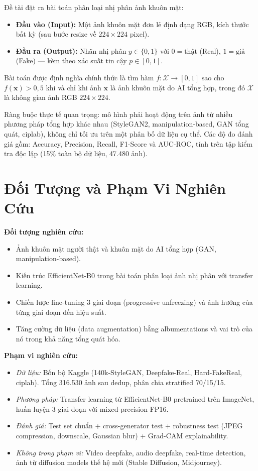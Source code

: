 Đề tài đặt ra bài toán phân loại nhị phân ảnh khuôn mặt:

\begin{itemize}
  \item \textbf{Đầu vào (Input):} Một ảnh khuôn mặt đơn lẻ định dạng RGB, kích thước bất kỳ (sau bước resize về $224 \times 224$ pixel).
  \item \textbf{Đầu ra (Output):} Nhãn nhị phân $y \in \{0, 1\}$ với $0 = \text{thật}$ (Real), $1 = \text{giả}$ (Fake) --- kèm theo xác suất tin cậy $p \in [0, 1]$.
\end{itemize}

Bài toán được định nghĩa chính thức là tìm hàm $f: \mathcal{X} \rightarrow [0,1]$ sao cho $f(\mathbf{x}) > 0{,}5$ khi và chỉ khi ảnh $\mathbf{x}$ là ảnh khuôn mặt do AI tổng hợp, trong đó $\mathcal{X}$ là không gian ảnh RGB $224 \times 224$.

Ràng buộc thực tế quan trọng: mô hình phải hoạt động trên ảnh từ nhiều phương pháp tổng hợp khác nhau (StyleGAN2, manipulation-based, GAN tổng quát, ciplab), không chỉ tối ưu trên một phân bố dữ liệu cụ thể. Các độ đo đánh giá gồm: Accuracy, Precision, Recall, F1-Score và AUC-ROC, tính trên tập kiểm tra độc lập (15\% toàn bộ dữ liệu, 47.480 ảnh).

\section{Đối Tượng và Phạm Vi Nghiên Cứu}

\textbf{Đối tượng nghiên cứu:}
\begin{itemize}
  \item Ảnh khuôn mặt người thật và khuôn mặt do AI tổng hợp (GAN, manipulation-based).
  \item Kiến trúc EfficientNet-B0 \cite{tan2019efficientnet} trong bài toán phân loại ảnh nhị phân với transfer learning.
  \item Chiến lược fine-tuning 3 giai đoạn (progressive unfreezing) và ảnh hưởng của từng giai đoạn đến hiệu suất.
  \item Tăng cường dữ liệu (data augmentation) bằng albumentations \cite{buslaev2020albumentations} và vai trò của nó trong khả năng tổng quát hóa.
\end{itemize}

\textbf{Phạm vi nghiên cứu:}
\begin{itemize}
  \item \textit{Dữ liệu:} Bốn bộ Kaggle (140k-StyleGAN, Deepfake-Real, Hard-FakeReal, ciplab). Tổng 316.530 ảnh sau dedup, phân chia stratified 70/15/15.
  \item \textit{Phương pháp:} Transfer learning từ EfficientNet-B0 pretrained trên ImageNet, huấn luyện 3 giai đoạn với mixed-precision FP16.
  \item \textit{Đánh giá:} Test set chuẩn + cross-generator test + robustness test (JPEG compression, downscale, Gaussian blur) + Grad-CAM explainability.
  \item \textit{Không trong phạm vi:} Video deepfake, audio deepfake, real-time detection, ảnh từ diffusion models thế hệ mới (Stable Diffusion, Midjourney).
\end{itemize}

